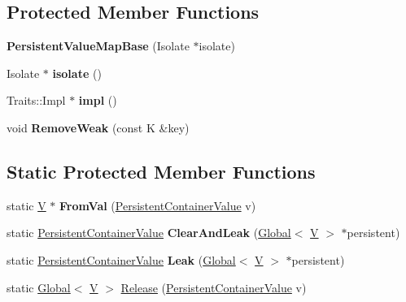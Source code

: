\subsection*{Protected Member Functions}
\begin{DoxyCompactItemize}
\item 
\mbox{\label{classv8_1_1PersistentValueMapBase_a1adee3f8b1ff929f07ddf9e94c6108ed}} 
{\bfseries Persistent\+Value\+Map\+Base} (Isolate $\ast$isolate)
\item 
\mbox{\label{classv8_1_1PersistentValueMapBase_af2e83791955c6027213dd979eebeb8f4}} 
Isolate $\ast$ {\bfseries isolate} ()
\item 
\mbox{\label{classv8_1_1PersistentValueMapBase_aacd576258fbffaf366436a6ecdd8cdf5}} 
Traits\+::\+Impl $\ast$ {\bfseries impl} ()
\item 
\mbox{\label{classv8_1_1PersistentValueMapBase_a5c16ace49c257f760c92a010a93b4884}} 
void {\bfseries Remove\+Weak} (const K \&key)
\end{DoxyCompactItemize}
\subsection*{Static Protected Member Functions}
\begin{DoxyCompactItemize}
\item 
\mbox{\label{classv8_1_1PersistentValueMapBase_af8fcd471f2d53ffca9881f7c436044e8}} 
static \mbox{\hyperlink{classV}{V}} $\ast$ {\bfseries From\+Val} (\mbox{\hyperlink{classuintptr__t}{Persistent\+Container\+Value}} v)
\item 
\mbox{\label{classv8_1_1PersistentValueMapBase_a7b083c75829bbc4177729ffe9827c4ac}} 
static \mbox{\hyperlink{classuintptr__t}{Persistent\+Container\+Value}} {\bfseries Clear\+And\+Leak} (\mbox{\hyperlink{classv8_1_1Global}{Global}}$<$ \mbox{\hyperlink{classV}{V}} $>$ $\ast$persistent)
\item 
\mbox{\label{classv8_1_1PersistentValueMapBase_adacf68ca7b9fb19deab68711a70a8313}} 
static \mbox{\hyperlink{classuintptr__t}{Persistent\+Container\+Value}} {\bfseries Leak} (\mbox{\hyperlink{classv8_1_1Global}{Global}}$<$ \mbox{\hyperlink{classV}{V}} $>$ $\ast$persistent)
\item 
static \mbox{\hyperlink{classv8_1_1Global}{Global}}$<$ \mbox{\hyperlink{classV}{V}} $>$ \mbox{\hyperlink{classv8_1_1PersistentValueMapBase_a9ffa7a4e0c59121c0471d71c04112966}{Release}} (\mbox{\hyperlink{classuintptr__t}{Persistent\+Container\+Value}} v)
\end{DoxyCompactItemize}


